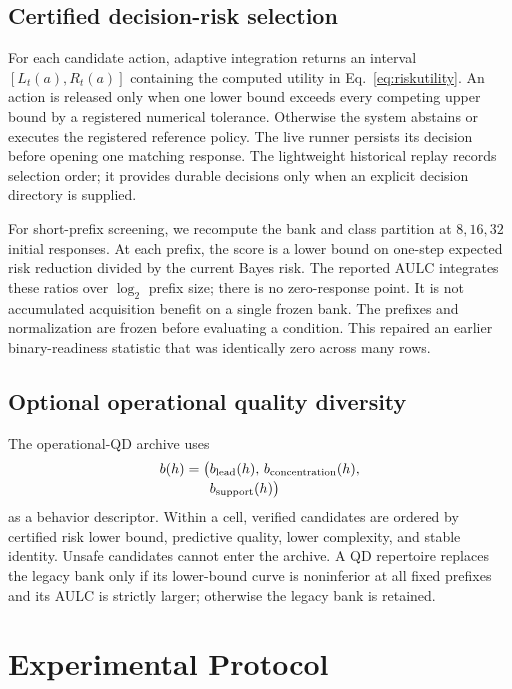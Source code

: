 \documentclass[twoside]{article}
\begin{document}
\subsection{Certified decision-risk selection}

For each candidate action, adaptive integration returns an interval
\([L_t(a),R_t(a)]\) containing the computed utility in
Eq.~\eqref{eq:riskutility}. An action is released only when one lower bound
exceeds every competing upper bound by a registered numerical tolerance.
Otherwise the system abstains or executes the registered reference policy.
The live runner persists its decision before opening one matching response.
The lightweight historical replay records selection order; it provides durable
decisions only when an explicit decision directory is supplied.

For short-prefix screening, we recompute the bank and class partition at
\(8,16,32\) initial responses. At each prefix, the score is a lower bound
on one-step expected risk reduction divided by the current Bayes risk.
The reported AULC integrates these ratios over \(\log_2\) prefix size;
there is no zero-response point. It is not accumulated acquisition benefit
on a single frozen bank. The prefixes and normalization are frozen before
evaluating a condition. This repaired an
earlier binary-readiness statistic that was identically zero across many
rows.

\subsection{Optional operational quality diversity}

The operational-QD archive uses
\[
\begin{aligned}
b(h)=\big(&b_{\rm lead}(h),\,b_{\rm concentration}(h),\\[-2pt]
          &b_{\rm support}(h)\big)
\end{aligned}
\]
as a behavior descriptor. Within a cell, verified candidates are ordered by
certified risk lower bound, predictive quality, lower complexity, and stable
identity. Unsafe candidates cannot enter the archive. A QD repertoire
replaces the legacy bank only if its lower-bound curve is noninferior at all
fixed prefixes and its AULC is strictly larger; otherwise the legacy bank is
retained.

\section{Experimental Protocol}
\end{document}
